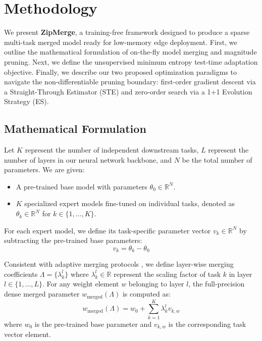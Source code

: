 \section{Methodology}
\label{sec:method}

We present \textbf{ZipMerge}, a training-free framework designed to produce a sparse multi-task merged model ready for low-memory edge deployment. First, we outline the mathematical formulation of on-the-fly model merging and magnitude pruning. Next, we define the unsupervised minimum entropy test-time adaptation objective. Finally, we describe our two proposed optimization paradigms to navigate the non-differentiable pruning boundary: first-order gradient descent via a Straight-Through Estimator (STE) and zero-order search via a 1+1 Evolution Strategy (ES).

\subsection{Mathematical Formulation}

Let $K$ represent the number of independent downstream tasks, $L$ represent the number of layers in our neural network backbone, and $N$ be the total number of parameters. We are given:
\begin{itemize}[leftmargin=*]
    \item A pre-trained base model with parameters $\theta_0 \in \mathbb{R}^N$.
    \item $K$ specialized expert models fine-tuned on individual tasks, denoted as $\theta_k \in \mathbb{R}^N$ for $k \in \{1, \dots, K\}$.
\end{itemize}

For each expert model, we define its task-specific parameter vector $v_k \in \mathbb{R}^N$ by subtracting the pre-trained base parameters:
\begin{equation}
    v_k = \theta_k - \theta_0
\end{equation}

Consistent with adaptive merging protocols \cite{yang2024adamerging}, we define layer-wise merging coefficients $\Lambda = \{ \lambda^l_k \}$ where $\lambda^l_k \in \mathbb{R}$ represent the scaling factor of task $k$ in layer $l \in \{1, \dots, L\}$. For any weight element $w$ belonging to layer $l$, the full-precision dense merged parameter $w_{\text{merged}}(\Lambda)$ is computed as:
\begin{equation}
    w_{\text{merged}}(\Lambda) = w_0 + \sum_{k=1}^K \lambda^l_k v_{k, w}
\end{equation}
where $w_0$ is the pre-trained base parameter and $v_{k, w}$ is the corresponding task vector element.

